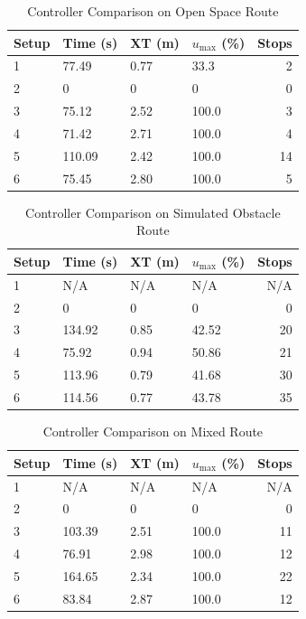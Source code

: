 \begin{table}[ht!]
\caption{Controller Comparison on Open Space Route}
\small
\centering
\begin{tabular}{@{}llllr@{}} \toprule
Setup & Time (s) & XT (m) & $u_{\text{max}}$ (\%) & Stops \\ \midrule
1     & 77.49    & 0.77   & 33.3                  & 2     \\
2     & 0        & 0      & 0                     & 0     \\
3     & 75.12    & 2.52   & 100.0                 & 3     \\
4     & 71.42    & 2.71   & 100.0                 & 4     \\
5     & 110.09   & 2.42   & 100.0                 & 14    \\
6     & 75.45    & 2.80   & 100.0                 & 5     \\ \bottomrule
\end{tabular}
\label{tab:resultsControllersOpenSpace}
\end{table}

\begin{table}[ht!]
\caption{Controller Comparison on Simulated Obstacle Route}
\small
\centering
\begin{tabular}{@{}llllr@{}} \toprule
Setup & Time (s) & XT (m) & $u_{\text{max}}$ (\%) & Stops \\ \midrule
1     & N/A      & N/A    & N/A                   & N/A   \\
2     & 0        & 0      & 0                     & 0     \\
3     & 134.92   & 0.85   & 42.52                 & 20    \\
4     & 75.92    & 0.94   & 50.86                 & 21    \\
5     & 113.96   & 0.79   & 41.68                 & 30    \\
6     & 114.56   & 0.77   & 43.78                 & 35    \\ \bottomrule
\end{tabular}
\label{tab:resultsControllersObstacles}
\end{table}

\begin{table}[ht!]
\caption{Controller Comparison on Mixed Route}
\small
\centering
\begin{tabular}{@{}llllr@{}} \toprule
Setup & Time (s) & XT (m) & $u_{\text{max}}$ (\%) & Stops \\ \midrule
1     & N/A      & N/A    & N/A                   & N/A   \\
2     & 0        & 0      & 0                     & 0     \\
3     & 103.39   & 2.51   & 100.0                 & 11    \\
4     & 76.91    & 2.98   & 100.0                 & 12    \\
5     & 164.65   & 2.34   & 100.0                 & 22    \\
6     & 83.84    & 2.87   & 100.0                 & 12    \\ \bottomrule
\end{tabular}
\label{tab:resultsControllersMixed}
\end{table}


